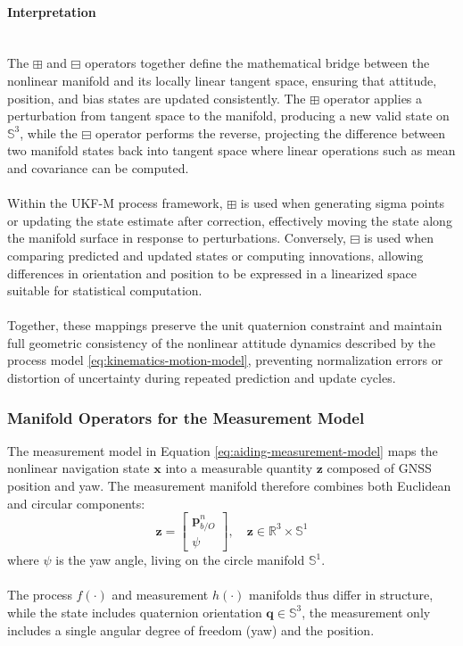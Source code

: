 \paragraph{Interpretation} \mbox{}\\[0.5em] \noindent
The $\boxplus$ and $\boxminus$ operators together define the mathematical bridge between the nonlinear manifold and its locally linear tangent space, ensuring that attitude, position, and bias states are updated consistently. The $\boxplus$ operator applies a perturbation from tangent space to the manifold, producing a new valid state on $\mathbb{S}^3$, while the $\boxminus$ operator performs the reverse, projecting the difference between two manifold states back into tangent space where linear operations such as mean and covariance can be computed.
\\ \\
Within the UKF-M process framework, $\boxplus$ is used when generating sigma points or updating the state estimate after correction, effectively moving the state along the manifold surface in response to perturbations. Conversely, $\boxminus$ is used when comparing predicted and updated states or computing innovations, allowing differences in orientation and position to be expressed in a linearized space suitable for statistical computation.
\\ \\
Together, these mappings preserve the unit quaternion constraint and maintain full geometric consistency of the nonlinear attitude dynamics described by the process model \ref{eq:kinematics-motion-model}, preventing normalization errors or distortion of uncertainty during repeated prediction and update cycles.



\subsubsection{Manifold Operators for the Measurement Model}
The measurement model in Equation \ref{eq:aiding-measurement-model} maps the nonlinear navigation state $\mathbf{x}$ into a measurable quantity $\mathbf{z}$ composed of GNSS position and yaw. The measurement manifold therefore combines both Euclidean and circular components:
$$
    \mathbf{z} =
    \begin{bmatrix}
        \mathbf{p}_{b/O}^{n} \\
        \psi
    \end{bmatrix},
    \quad
    \mathbf{z} \in \mathbb{R}^3 \times \mathbb{S}^1
$$
where $\psi$ is the yaw angle, living on the circle manifold $\mathbb{S}^1$. 
\\ \\
The process $f(\cdot)$ and measurement $h(\cdot)$ manifolds thus differ in structure, while the state includes quaternion orientation $\mathbf{q} \in \mathbb{S}^3$, the measurement only includes a single angular degree of freedom (yaw) and the position.  

